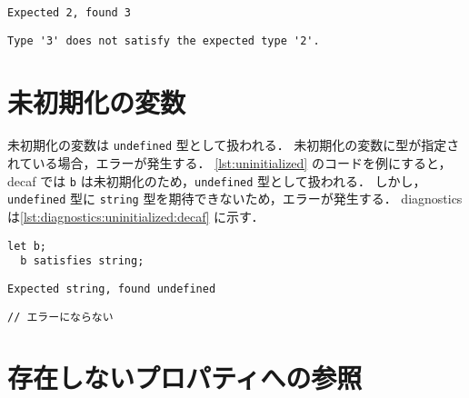 \begin{minipage}{0.45\textwidth}
    \begin{lstlisting}[caption=decaf の diagnostics, label=lst:diagnostics:shadowing:decaf]
    Expected 2, found 3
  \end{lstlisting}
\end{minipage}
\hfill
\begin{minipage}{0.45\textwidth}
    \begin{lstlisting}[caption=tsc の diagnostics, label=lst:diagnostics:shadowing:tsc]
    Type '3' does not satisfy the expected type '2'.
  \end{lstlisting}
\end{minipage}

\section{未初期化の変数}

未初期化の変数は \texttt{undefined} 型として扱われる．
未初期化の変数に型が指定されている場合，エラーが発生する．
\ref{lst:uninitialized} のコードを例にすると，decaf では \texttt{b} は未初期化のため，\texttt{undefined} 型として扱われる．
しかし，\texttt{undefined} 型に \texttt{string} 型を期待できないため，エラーが発生する．
diagnostics は\ref{lst:diagnostics:uninitialized:decaf} に示す．

\begin{lstlisting}[caption=未初期化の変数の例, label=lst:uninitialized]
  let b;
  b satisfies string;
\end{lstlisting}

\begin{minipage}{0.45\textwidth}
    \begin{lstlisting}[caption=decaf の diagnostics, label=lst:diagnostics:uninitialized:decaf]
    Expected string, found undefined
  \end{lstlisting}
\end{minipage}
\hfill
\begin{minipage}{0.45\textwidth}
    \begin{lstlisting}[caption=tsc の diagnostics, label=lst:diagnostics:uninitialized:tsc]
    // エラーにならない
  \end{lstlisting}
\end{minipage}

\section{存在しないプロパティへの参照}

